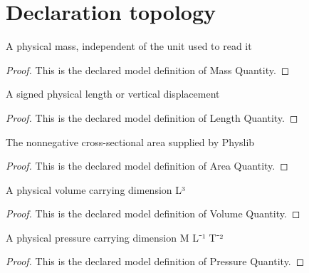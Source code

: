 \section{Declaration topology}
\begin{definition}
  \label{def:physics:phyx-mini-0396:phyxminiproblems-problemphyxmini0396-massquantity}
  A physical mass, independent of the unit used to read it
\end{definition}
\begin{proof}
  This is the declared model definition of Mass Quantity.
\end{proof}
\begin{definition}
  \label{def:physics:phyx-mini-0396:phyxminiproblems-problemphyxmini0396-lengthquantity}
  A signed physical length or vertical displacement
\end{definition}
\begin{proof}
  This is the declared model definition of Length Quantity.
\end{proof}
\begin{definition}
  \label{def:physics:phyx-mini-0396:phyxminiproblems-problemphyxmini0396-areaquantity}
  The nonnegative cross-sectional area supplied by Physlib
\end{definition}
\begin{proof}
  This is the declared model definition of Area Quantity.
\end{proof}
\begin{definition}
  \label{def:physics:phyx-mini-0396:phyxminiproblems-problemphyxmini0396-volumequantity}
  A physical volume carrying dimension L³
\end{definition}
\begin{proof}
  This is the declared model definition of Volume Quantity.
\end{proof}
\begin{definition}
  \label{def:physics:phyx-mini-0396:phyxminiproblems-problemphyxmini0396-pressurequantity}
  A physical pressure carrying dimension M L⁻¹ T⁻²
\end{definition}
\begin{proof}
  This is the declared model definition of Pressure Quantity.
\end{proof}
